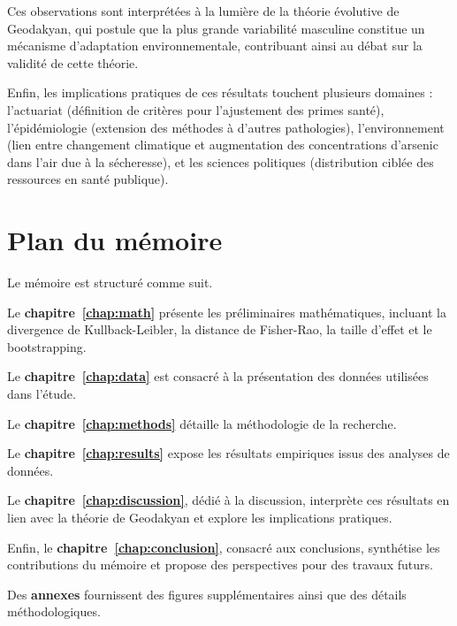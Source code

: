 Ces observations sont interprétées à la lumière de la théorie évolutive de Geodakyan, qui postule que la plus grande variabilité masculine constitue un mécanisme d'adaptation environnementale, contribuant ainsi au débat sur la validité de cette théorie.

Enfin, les implications pratiques de ces résultats touchent plusieurs domaines : l'actuariat (définition de critères pour l'ajustement des primes santé), l'épidémiologie (extension des méthodes à d'autres pathologies), l'environnement (lien entre changement climatique et augmentation des concentrations d'arsenic dans l'air due à la sécheresse), et les sciences politiques (distribution ciblée des ressources en santé publique).

\section{Plan du mémoire}

Le mémoire est structuré comme suit.

Le \textbf{chapitre~\ref{chap:math}} présente les préliminaires mathématiques, incluant la divergence de Kullback-Leibler, la distance de Fisher-Rao, la taille d'effet et le bootstrapping.

Le \textbf{chapitre~\ref{chap:data}} est consacré à la présentation des données utilisées dans l’étude.

Le \textbf{chapitre~\ref{chap:methods}} détaille la méthodologie de la recherche.

Le \textbf{chapitre~\ref{chap:results}} expose les résultats empiriques issus des analyses de données.

Le \textbf{chapitre~\ref{chap:discussion}}, dédié à la discussion, interprète ces résultats en lien avec la théorie de Geodakyan et explore les implications pratiques.

Enfin, le \textbf{chapitre~\ref{chap:conclusion}}, consacré aux conclusions, synthétise les contributions du mémoire et propose des perspectives pour des travaux futurs.

Des \textbf{annexes} fournissent des figures supplémentaires ainsi que des détails méthodologiques.